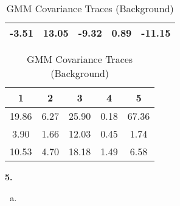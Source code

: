 \documentclass{article}
\begin{document}
\begin{enumerate}[(a)]
\begin{table}[H]
\begin{minipage}[b]{0.45\linewidth}
\begin{tabular}{@{}ccccc@{}}
                -3.51 & 13.05 & -9.32 & 0.89 & -11.15 \\ \bottomrule
            \end{tabular}
        \end{minipage}
        \hfill
        \begin{minipage}[b]{0.45\linewidth}
            \centering
            \caption{GMM Covariance Traces (Background)}
            \begin{tabular}{@{}ccccc@{}}
                \toprule
                1 & 2 & 3 & 4 & 5\\ \midrule
                19.86 & 6.27 & 25.90 & 0.18 & 67.36\\
                3.90 & 1.66 & 12.03 & 0.45 & 1.74 \\
                10.53 & 4.70 & 18.18 & 1.49 & 6.58 \\ \bottomrule
            \end{tabular}
        \end{minipage}
    \end{table}
\end{enumerate}
\textbf{5.} \begin{enumerate}[(a)]
    \item 
\end{enumerate}
\end{document}
